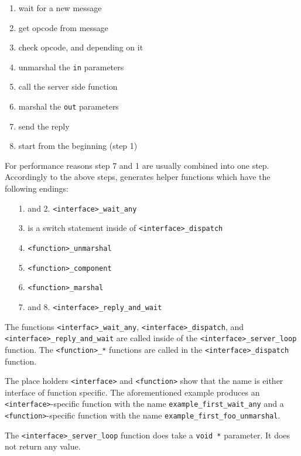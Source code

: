 \begin{enumerate}
\item wait for a new message
\item get opcode from message
\item check opcode, and depending on it
\item unmarshal the \verb|in| parameters
\item call the server side function
\item marshal the \verb|out| parameters
\item send the reply
\item start from the beginning (step 1)
\end{enumerate}

For performance reasons step 7 and 1 are usually combined into one step.
Accordingly to the above steps, \dice{} generates helper functions which have
the following endings:

\begin{enumerate}
\item[1.] and 2. \verb|<interface>_wait_any|
\item[3.] is a switch statement inside of \verb|<interface>_dispatch|
\item[4.] \verb|<function>_unmarshal|
\item[5.] \verb|<function>_component|
\item[6.] \verb|<function>_marshal|
\item[7.] and 8. \verb|<interface>_reply_and_wait|
\end{enumerate}

The functions \verb|<interfac>_wait_any|, \verb|<interface>_dispatch|,
and \verb|<interface>_reply_and_wait| are called inside of the
\verb|<interface>_server_loop| function. The \verb|<function>_*|
functions are called in the \verb|<interface>_dispatch| function.

The place holders \verb|<interface>| and \verb|<function>| show that
the name is either interface of function specific.
The aforementioned example produces
an \verb|<interface>|-specific function with the name
\verb|example_first_wait_any| and a \verb|<function>|-specific function
with the name \verb|example_first_foo_unmarshal|.


The \verb|<interface>_server_loop| function does take a \verb|void *|
parameter. It does not return any value.

